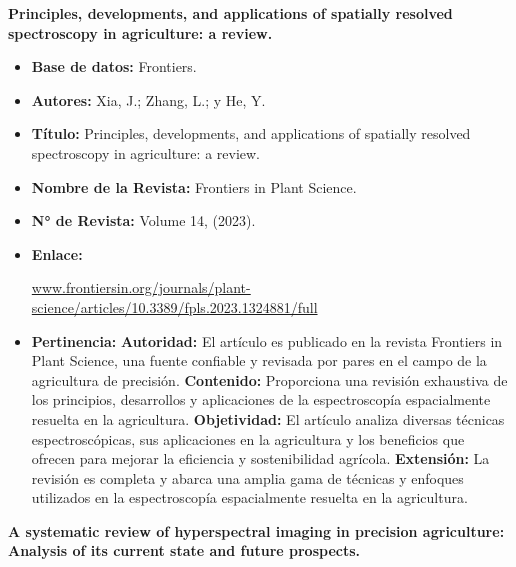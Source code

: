 \textbf{Principles, developments,
and applications of spatially
resolved spectroscopy in
agriculture: a review. \cite{Xia2023}}
\begin{itemize}
  \item \textbf{Base de datos:} Frontiers.
  \item \textbf{Autores:} Xia, J.; Zhang, L.; y He, Y.
  \item \textbf{Título:} Principles, developments, and applications of spatially resolved spectroscopy in agriculture: a review.
  \item \textbf{Nombre de la Revista:} Frontiers in Plant Science.
  \item \textbf{N° de Revista:} Volume 14, (2023).
  \item \textbf{Enlace:}
  
  \url{www.frontiersin.org/journals/plant-science/articles/10.3389/fpls.2023.1324881/full}
  \item \textbf{Pertinencia:}
  \subitem \textbf{Autoridad:} El artículo es publicado en la revista Frontiers in Plant Science, una fuente confiable y revisada por pares en el campo de la agricultura de precisión.
  \subitem \textbf{Contenido:} Proporciona una revisión exhaustiva de los principios, desarrollos y aplicaciones de la espectroscopía espacialmente resuelta en la agricultura.
  \subitem \textbf{Objetividad:} El artículo analiza diversas técnicas espectroscópicas, sus aplicaciones en la agricultura y los beneficios que ofrecen para mejorar la eficiencia y sostenibilidad agrícola.
  \subitem \textbf{Extensión:} La revisión es completa y abarca una amplia gama de técnicas y enfoques utilizados en la espectroscopía espacialmente resuelta en la agricultura.
\end{itemize}

\newpage

\textbf{A systematic review of hyperspectral imaging in precision agriculture:
Analysis of its current state and future prospects. \cite{Ram2024}}

